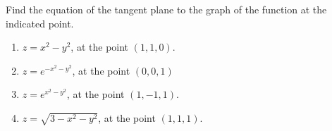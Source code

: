 
Find the equation of the tangent plane to the graph of the function at the indicated point.
\begin{enumerate}
\item $z= x^2- y^2$, at the point $(1, 1,0)$.

\answer{$ $}
\item $z= e^{-x^2-y^2}$, at the point $(0,0,1)$

\item $z= e^{x^2-y^2}$, at the point $(1,-1,1)$.

\item $z=\sqrt{3-x^2-y^2} $, at the point $(1,1,1)$.

\answer{$ $}
\end{enumerate}